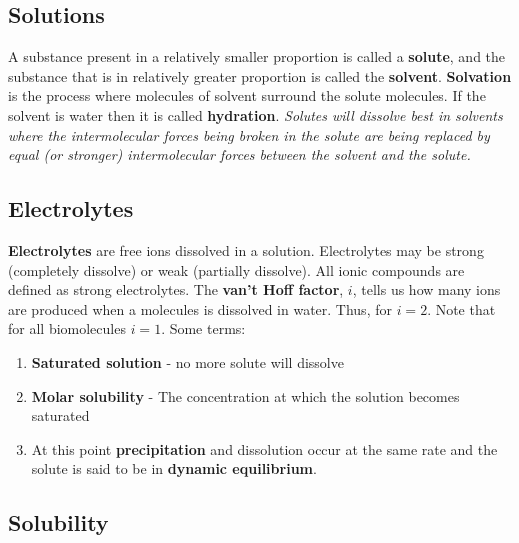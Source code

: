 \documentclass[../GChemReview.tex]{subfiles}
\begin{document}
	\subsection{Solutions}
	
	A substance present in a relatively smaller proportion is called a \textbf{solute}, and the  substance that is in relatively greater proportion is called the \textbf{solvent}. \textbf{Solvation} is the process where molecules of solvent surround the solute molecules. If the solvent is water then it is called \textbf{hydration}. \emph{Solutes will dissolve best in solvents where the intermolecular forces being broken in the solute are being replaced by equal (or stronger) intermolecular forces between the solvent and the solute.}
	
	\subsection{Electrolytes}
	
	\textbf{Electrolytes} are free ions dissolved in a solution. Electrolytes may be strong (completely dissolve) or weak (partially dissolve). All ionic compounds are defined as strong electrolytes. The \textbf{van't Hoff factor}, $ i $, tells us how many ions are produced when a molecules is dissolved in water. Thus, for  $ i = 2 $. Note that for all biomolecules $ i = 1 $. Some terms:
	\begin{enumerate}
		\item \textbf{Saturated solution} - no more solute will dissolve
		\item \textbf{Molar solubility} - The concentration at which the solution becomes saturated
		\item At this point \textbf{precipitation} and dissolution occur at the same rate and the solute is said to be in \textbf{dynamic equilibrium}.
	\end{enumerate}
	
	\subsection{Solubility}
	
\end{document}
